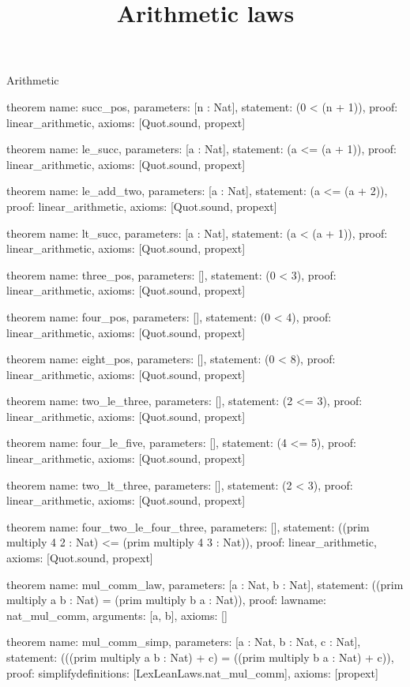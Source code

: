 \begin{lexlean}{Arithmetic}
\title{Arithmetic laws}
\begin{semanticmodule}
theorem{
  name: succ_pos,
  parameters: [n : Nat],
  statement: (0 < (n + 1)),
  proof: linear_arithmetic{},
  axioms: [Quot.sound, propext]
}

theorem{
  name: le_succ,
  parameters: [a : Nat],
  statement: (a <= (a + 1)),
  proof: linear_arithmetic{},
  axioms: [Quot.sound, propext]
}

theorem{
  name: le_add_two,
  parameters: [a : Nat],
  statement: (a <= (a + 2)),
  proof: linear_arithmetic{},
  axioms: [Quot.sound, propext]
}

theorem{
  name: lt_succ,
  parameters: [a : Nat],
  statement: (a < (a + 1)),
  proof: linear_arithmetic{},
  axioms: [Quot.sound, propext]
}

theorem{
  name: three_pos,
  parameters: [],
  statement: (0 < 3),
  proof: linear_arithmetic{},
  axioms: [Quot.sound, propext]
}

theorem{
  name: four_pos,
  parameters: [],
  statement: (0 < 4),
  proof: linear_arithmetic{},
  axioms: [Quot.sound, propext]
}

theorem{
  name: eight_pos,
  parameters: [],
  statement: (0 < 8),
  proof: linear_arithmetic{},
  axioms: [Quot.sound, propext]
}

theorem{
  name: two_le_three,
  parameters: [],
  statement: (2 <= 3),
  proof: linear_arithmetic{},
  axioms: [Quot.sound, propext]
}

theorem{
  name: four_le_five,
  parameters: [],
  statement: (4 <= 5),
  proof: linear_arithmetic{},
  axioms: [Quot.sound, propext]
}

theorem{
  name: two_lt_three,
  parameters: [],
  statement: (2 < 3),
  proof: linear_arithmetic{},
  axioms: [Quot.sound, propext]
}

theorem{
  name: four_two_le_four_three,
  parameters: [],
  statement: ((prim multiply 4 2 : Nat) <= (prim multiply 4 3 : Nat)),
  proof: linear_arithmetic{},
  axioms: [Quot.sound, propext]
}

theorem{
  name: mul_comm_law,
  parameters: [a : Nat, b : Nat],
  statement: ((prim multiply a b : Nat) = (prim multiply b a : Nat)),
  proof: law{name: nat_mul_comm, arguments: [a, b]},
  axioms: []
}

theorem{
  name: mul_comm_simp,
  parameters: [a : Nat, b : Nat, c : Nat],
  statement: (((prim multiply a b : Nat) + c) = ((prim multiply b a : Nat) + c)),
  proof: simplify{definitions: [LexLeanLaws.nat_mul_comm]},
  axioms: [propext]
}


\end{semanticmodule}
\end{lexlean}
